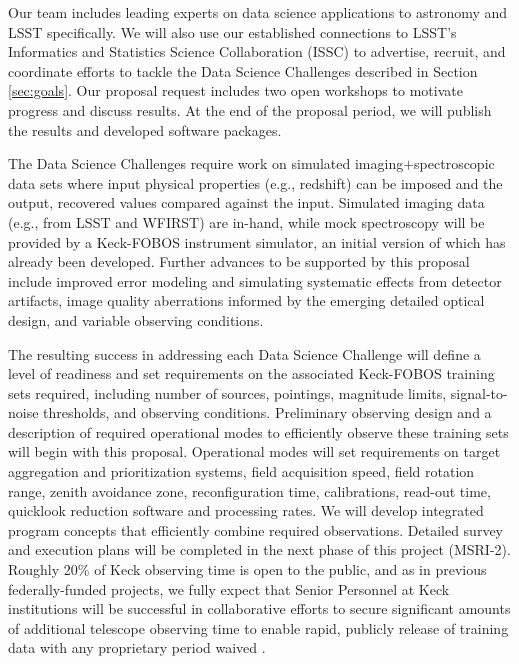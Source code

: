 \documentclass[oneside,11pt]{amsart}
\begin{document}
Our team includes leading experts on data science applications to astronomy and LSST specifically.  We will also use
our established connections to LSST's Informatics and Statistics Science Collaboration (ISSC) to advertise, recruit,
and coordinate efforts to tackle the Data Science Challenges described in Section \ref{sec:goals}.  Our proposal
request includes two open workshops to motivate progress and discuss results. At the end of the proposal period, we
will publish the results and developed software packages.

The Data Science Challenges require work on simulated imaging$+$spectroscopic data sets where input physical properties
(e.g., redshift) can be imposed and the output, recovered values compared against the input.  Simulated imaging data
(e.g., from LSST and WFIRST) are in-hand, while mock spectroscopy will be provided by a Keck-FOBOS instrument simulator,
an initial version of which has already been developed.  Further advances to be supported by this proposal include
improved error modeling and simulating systematic effects from detector artifacts, image quality aberrations informed
by the emerging detailed optical design, and variable observing conditions.

The resulting success in addressing each Data Science Challenge will define a level of readiness and set requirements
on the associated Keck-FOBOS training sets required, including number of sources, pointings, magnitude limits,
signal-to-noise thresholds, and observing conditions.  Preliminary observing design and a description of required
operational modes to efficiently observe these training sets will begin with this proposal.  Operational modes will set
requirements on target aggregation and prioritization systems, field acquisition speed, field rotation range, zenith
avoidance zone, reconfiguration time, calibrations, read-out time, quicklook reduction software and processing rates.
We will develop integrated program concepts that efficiently combine required observations.  Detailed survey and
execution plans will be completed in the next phase of this project (MSRI-2).  Roughly 20\% of Keck observing time is
open to the public, and as in previous federally-funded projects, we fully expect that Senior Personnel at Keck
institutions will be successful in collaborative efforts to secure significant amounts of additional telescope
observing time to enable rapid, publicly release of training data with any proprietary period waived
\citep[e.g.,][]{newman13}.
\end{document}
